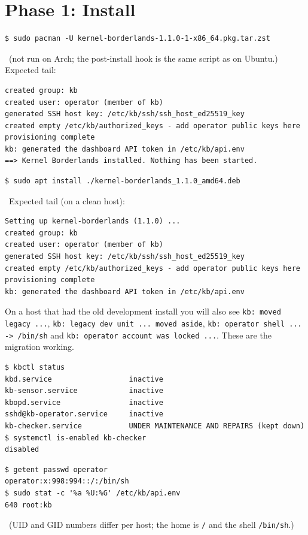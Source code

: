 \section{Phase 1: Install}
\resetsteps
{}
\ifarch
\begin{lstlisting}[style=console]
$ sudo pacman -U kernel-borderlands-1.1.0-1-x86_64.pkg.tar.zst
\end{lstlisting}
\notrun\ (not run on Arch; the post-install hook is the same script as on Ubuntu.) Expected tail:
\begin{lstlisting}[style=console]
created group: kb
created user: operator (member of kb)
generated SSH host key: /etc/kb/ssh/ssh_host_ed25519_key
created empty /etc/kb/authorized_keys - add operator public keys here
provisioning complete
kb: generated the dashboard API token in /etc/kb/api.env
==> Kernel Borderlands installed. Nothing has been started.
\end{lstlisting}
\else
\begin{lstlisting}[style=console]
$ sudo apt install ./kernel-borderlands_1.1.0_amd64.deb
\end{lstlisting}
\verified\ Expected tail (on a clean host):
\begin{lstlisting}[style=console]
Setting up kernel-borderlands (1.1.0) ...
created group: kb
created user: operator (member of kb)
generated SSH host key: /etc/kb/ssh/ssh_host_ed25519_key
created empty /etc/kb/authorized_keys - add operator public keys here
provisioning complete
kb: generated the dashboard API token in /etc/kb/api.env
\end{lstlisting}
On a host that had the old development install you will also see \texttt{kb: moved legacy ...}, \texttt{kb: legacy dev unit ... moved aside},
\texttt{kb: operator shell ... -> /bin/sh} and \texttt{kb: operator account was locked ...}. These are the migration working. \verified
\fi
{}
\begin{lstlisting}[style=console]
$ kbctl status
kbd.service                  inactive
kb-sensor.service            inactive
kbopd.service                inactive
sshd@kb-operator.service     inactive
kb-checker.service           UNDER MAINTENANCE AND REPAIRS (kept down)
$ systemctl is-enabled kb-checker
disabled
\end{lstlisting}
\verified
{}
\begin{lstlisting}[style=console]
$ getent passwd operator
operator:x:998:994::/:/bin/sh
$ sudo stat -c '%a %U:%G' /etc/kb/api.env
640 root:kb
\end{lstlisting}
\verified\ (UID and GID numbers differ per host; the home is \texttt{/} and the shell \texttt{/bin/sh}.)

